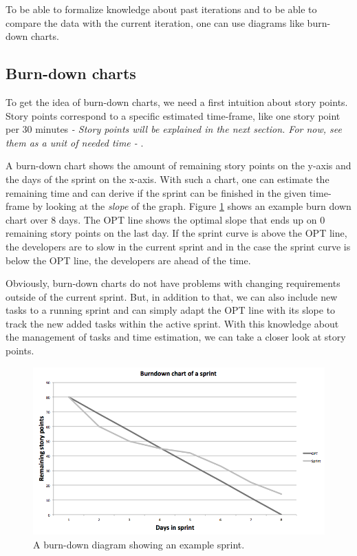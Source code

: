 To be able to formalize knowledge about past iterations and to be able to compare the data with the current iteration, one can use diagrams like burn-down charts.

\subsection{Burn-down charts}
To get the idea of burn-down charts, we need a first intuition about story points. Story points correspond to a specific estimated time-frame, like one story point per 30 minutes \emph{- Story points will be explained in the next section. For now, see them as a unit of needed time - }.

A burn-down chart shows the amount of remaining story points on the y-axis and the days of the sprint on the x-axis. With such a chart, one can estimate the remaining time and can derive if the sprint can be finished in the given time-frame by looking at the \textit{slope} of the graph. Figure \ref{Burndown example} shows an example burn down chart over 8 days. The OPT line shows the optimal slope that ends up on 0 remaining story points on the last day. If the sprint curve is above the OPT line, the developers are to slow in the current sprint and in the case the sprint curve is below the OPT line, the developers are ahead of the time. 

Obviously, burn-down charts do not have problems with changing requirements outside of the current sprint. 
But, in addition to that, we can also include new tasks to a running sprint and can simply adapt the OPT line with its slope to track the new added tasks within the active sprint. With this knowledge about the management of tasks and time estimation, we can take a closer look at story points.

\begin{figure}[th]
\centerline{\includegraphics[width=1\textwidth]{gfx/burndown}}
\caption{A burn-down diagram showing an example sprint.}
\label{Burndown example}
\end{figure}

